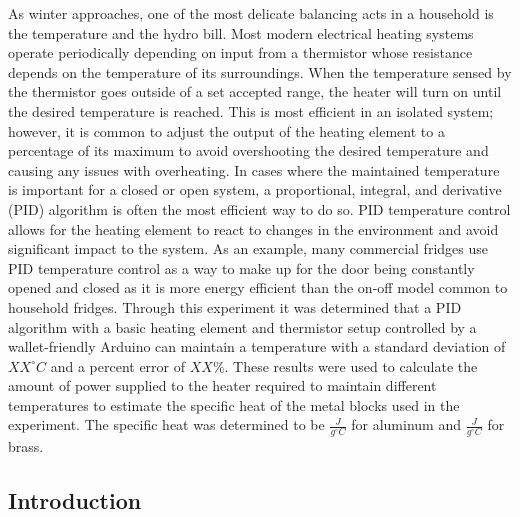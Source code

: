 \documentclass[11pt]{article}
\begin{document}
    As winter approaches, one of the most delicate balancing acts in a
household is the temperature and the hydro bill. Most modern electrical
heating systems operate periodically depending on input from a
thermistor whose resistance depends on the temperature of its
surroundings. When the temperature sensed by the thermistor goes outside
of a set accepted range, the heater will turn on until the desired
temperature is reached. This is most efficient in an isolated system;
however, it is common to adjust the output of the heating element to a
percentage of its maximum to avoid overshooting the desired temperature
and causing any issues with overheating. In cases where the maintained
temperature is important for a closed or open system, a proportional,
integral, and derivative (PID) algorithm is often the most efficient way
to do so. PID temperature control allows for the heating element to
react to changes in the environment and avoid significant impact to the
system. As an example, many commercial fridges use PID temperature
control as a way to make up for the door being constantly opened and
closed as it is more energy efficient than the on-off model common to
household fridges. Through this experiment it was determined that a PID
algorithm with a basic heating element and thermistor setup controlled
by a wallet-friendly Arduino can maintain a temperature with a standard
deviation of \(XX^{\circ }C\) and a percent error of \(XX\%\). These
results were used to calculate the amount of power supplied to the
heater required to maintain different temperatures to estimate the
specific heat of the metal blocks used in the experiment. The specific
heat was determined to be \(\frac{J}{g^{\circ}C}\) for aluminum and
\(\frac{J}{g^{\circ}C}\) for brass.

    \hypertarget{introduction}{%
\subsection{Introduction}\label{introduction}}
\end{document}
